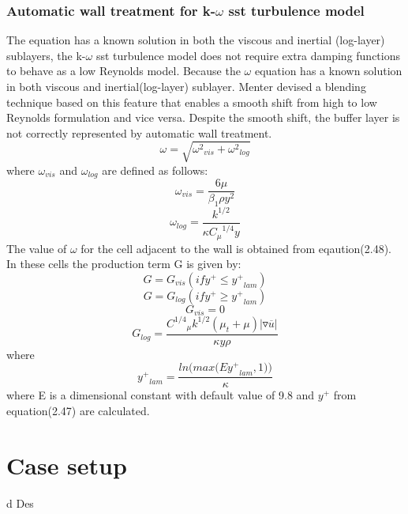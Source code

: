 \subsection{Automatic wall treatment for k-$\omega$ sst turbulence model}
The equation has a known solution in both the viscous and inertial (log-layer) sublayers, the k-$\omega$ sst turbulence model does not require extra damping functions to behave as a low Reynolds model.
Because the $\omega$ equation has a known solution in both viscous and inertial(log-layer) sublayer. Menter devised a blending technique based on this feature that enables a smooth shift from high to low Reynolds formulation and vice versa.
Despite the smooth shift, the buffer layer is not correctly represented by automatic wall treatment. 
\begin{equation}
{\omega}={\sqrt{{{{{\omega}^2}_{vis}}}+{{{{\omega}^2}_{log}}}}}
\end{equation}
where ${\omega}_{vis}$ and ${\omega}_{log}$ are defined as follows:
\begin{equation}
{{\omega}_{vis}}={\frac{6\mu}{{{\beta}_1}{\rho}{y^2}}}
\end{equation}
\begin{equation}
{{\omega}_{log}}={\frac{{k}^{1/2}}{\kappa {{C_{\mu}}^{1/4}} y}}
\end{equation}
The value of $\omega$ for the cell adjacent to the wall is obtained from eqaution(2.48). In these cells the production term G is given by:
\begin{equation}
G={G_{vis}}   (if {y^+}\le{{{y}^+}_{lam}})
\end{equation}
\begin{equation}
G={{G}_{log}} (if {{y^+}}\ge{{{y}^+}_{lam}})
\end{equation}
\begin{equation}
{G_{vis}}=0
\end{equation}
\begin{equation}
{G_{log}}={\frac{{{C}^{1/4}}_{\mu} {{k}^{1/2}}({{\mu}_t}+{\mu})\vert{{\triangledown \overline{u}}}\vert}{\kappa y {\rho}}}
\end{equation}
where
\begin{equation}
{{y^+}_{lam}}={\frac{{ln\bigg(max\bigg(E{{y^+}_{lam}},1\bigg)\bigg)}}{\kappa}}
\end{equation}
where E is a dimensional constant with default value of 9.8 and ${y}^+$ from equation(2.47) are calculated.
\chapter{Case setup}d Des
